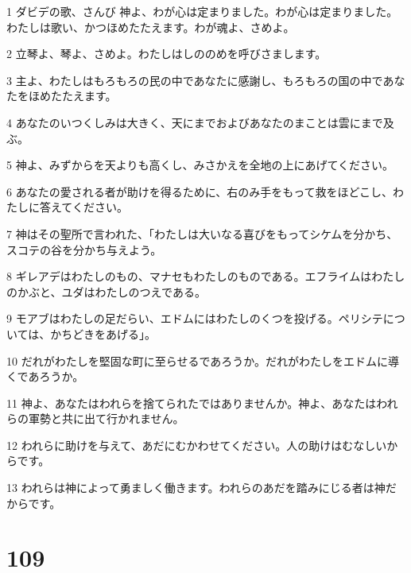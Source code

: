 \par 1 ダビデの歌、さんび 神よ、わが心は定まりました。わが心は定まりました。わたしは歌い、かつほめたたえます。わが魂よ、さめよ。
\par 2 立琴よ、琴よ、さめよ。わたしはしののめを呼びさまします。
\par 3 主よ、わたしはもろもろの民の中であなたに感謝し、もろもろの国の中であなたをほめたたえます。
\par 4 あなたのいつくしみは大きく、天にまでおよびあなたのまことは雲にまで及ぶ。
\par 5 神よ、みずからを天よりも高くし、みさかえを全地の上にあげてください。
\par 6 あなたの愛される者が助けを得るために、右のみ手をもって救をほどこし、わたしに答えてください。
\par 7 神はその聖所で言われた、「わたしは大いなる喜びをもってシケムを分かち、スコテの谷を分かち与えよう。
\par 8 ギレアデはわたしのもの、マナセもわたしのものである。エフライムはわたしのかぶと、ユダはわたしのつえである。
\par 9 モアブはわたしの足だらい、エドムにはわたしのくつを投げる。ペリシテについては、かちどきをあげる」。
\par 10 だれがわたしを堅固な町に至らせるであろうか。だれがわたしをエドムに導くであろうか。
\par 11 神よ、あなたはわれらを捨てられたではありませんか。神よ、あなたはわれらの軍勢と共に出て行かれません。
\par 12 われらに助けを与えて、あだにむかわせてください。人の助けはむなしいからです。
\par 13 われらは神によって勇ましく働きます。われらのあだを踏みにじる者は神だからです。

\chapter{109}

